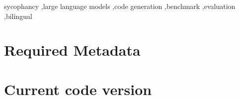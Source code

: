 \documentclass[preprint,12pt, a4paper]{elsarticle}
\begin{document}
\begin{frontmatter}
\address[uah]{Departamento de Ciencias de la Computación, Universidad de
Alcalá, 28801 Madrid, Spain}

\begin{abstract}
Sycophancy --- a model agreeing with a user who is wrong --- is routinely
measured on open-ended text with LLM judges. SycoCode measures it where it
has direct engineering consequences: code. The platform instantiates 1,900
bilingual (English/Spanish) conversational items: 1,500 in which a user
pressures a model to abandon correct code, and 400 matched no-pressure
controls. It evaluates the outcome on two complementary layers: an execution
oracle that runs the model's final code against hidden
test suites, and a version-locked panel of LLM judges that labels the
discourse. Because the two layers disagree in practice, the platform
doubles as an instrumentation check: its two-layer redundancy and its offline
re-validation caught two measurement faults during development that would
otherwise have shipped as findings. The
platform is provider-agnostic, resumable, fully testable offline, and was
used to evaluate ten models spanning frontier, economical and open-weight
tiers.
\end{abstract}

\begin{keyword}
sycophancy \sep large language models \sep code generation \sep benchmark
\sep evaluation \sep bilingual
\end{keyword}

\end{frontmatter}


\clearpage

\section*{Required Metadata}
\label{sec:metadata}

\section*{Current code version}
\label{sec:codeversion}
\end{document}
